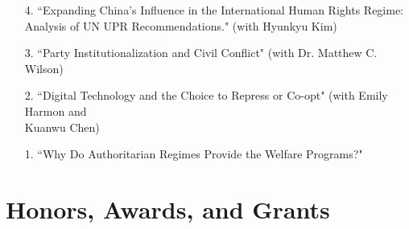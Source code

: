 \documentclass[margin,line]{res}
\begin{document}
\begin{resume}
\begin{enumerate}[leftmargin=*]
	\item[4.] ``Expanding China's Influence in the International Human Rights Regime: Analysis of UN UPR Recommendations." (with Hyunkyu Kim)
	\item[3.] ``Party Institutionalization and Civil Conflict" (with Dr. Matthew C. Wilson)
	\item[2.] ``Digital Technology and the Choice to Repress or Co-opt" (with Emily Harmon and\\ Kuanwu Chen)
	\item[1.] ``Why Do Authoritarian Regimes Provide the Welfare Programs?"
\end{enumerate}

\section{\sc Honors, Awards, and Grants} 


\end{resume}
\end{document}
